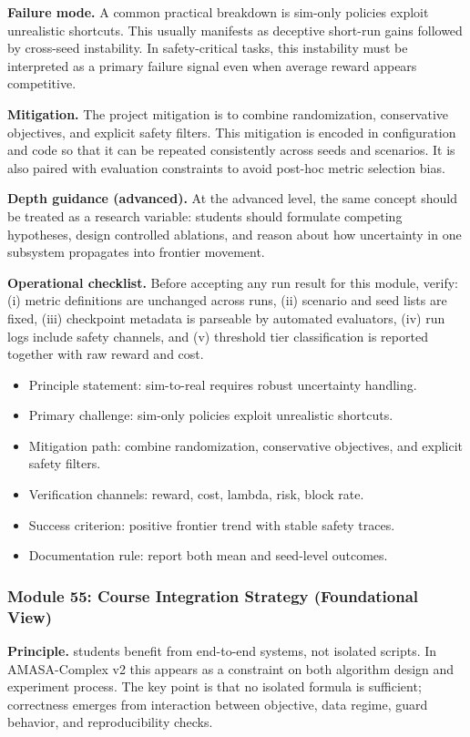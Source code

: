 \documentclass[conference]{IEEEtran}
\begin{document}
\textbf{Failure mode.} A common practical breakdown is sim-only policies exploit unrealistic shortcuts. This usually manifests as deceptive short-run gains followed by cross-seed instability. In safety-critical tasks, this instability must be interpreted as a primary failure signal even when average reward appears competitive.

\textbf{Mitigation.} The project mitigation is to combine randomization, conservative objectives, and explicit safety filters. This mitigation is encoded in configuration and code so that it can be repeated consistently across seeds and scenarios. It is also paired with evaluation constraints to avoid post-hoc metric selection bias.

\textbf{Depth guidance (advanced).} At the advanced level, the same concept should be treated as a research variable: students should formulate competing hypotheses, design controlled ablations, and reason about how uncertainty in one subsystem propagates into frontier movement.

\textbf{Operational checklist.} Before accepting any run result for this module, verify: (i) metric definitions are unchanged across runs, (ii) scenario and seed lists are fixed, (iii) checkpoint metadata is parseable by automated evaluators, (iv) run logs include safety channels, and (v) threshold tier classification is reported together with raw reward and cost.

\begin{itemize}[leftmargin=*]
  \item Principle statement: sim-to-real requires robust uncertainty handling.
  \item Primary challenge: sim-only policies exploit unrealistic shortcuts.
  \item Mitigation path: combine randomization, conservative objectives, and explicit safety filters.
  \item Verification channels: reward, cost, lambda, risk, block rate.
  \item Success criterion: positive frontier trend with stable safety traces.
  \item Documentation rule: report both mean and seed-level outcomes.
\end{itemize}


\subsubsection{Module 55: Course Integration Strategy (Foundational View)}
\textbf{Principle.} students benefit from end-to-end systems, not isolated scripts. In AMASA-Complex v2 this appears as a constraint on both algorithm design and experiment process. The key point is that no isolated formula is sufficient; correctness emerges from interaction between objective, data regime, guard behavior, and reproducibility checks.
\end{document}
